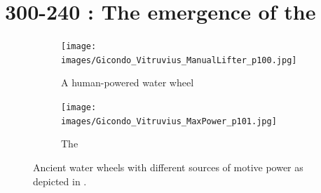 \documentclass[a4paper, 12pt]{article}
\begin{document}






\section{300-240 \bce: The emergence of the \SE}
\label{sec:stesibuque}

\begin{figure}[H]
    \centering
    \begin{subfigure}{.45\textwidth}
        \centering
        \texttt{[image: images/Gicondo\_Vitruvius\_ManualLifter\_p100.jpg]}
        \caption{A human-powered water wheel} \label{fig:Gicondo_Vitruvius_MaxPower_p100}
    \end{subfigure}
    \hspace{2em}%
    \begin{subfigure}{.45\textwidth}
        \centering
        \texttt{[image: images/Gicondo\_Vitruvius\_MaxPower\_p101.jpg]}
        \caption{The \SE} \label{fig:Gicondo_Vitruvius_MaxPower_p101}
    \end{subfigure}
    \caption{Ancient water wheels with different sources of motive power as depicted in \citet[pp.~100-101]{vitruvius_architectura_1511}.}  \label{fig:two:wheels}
\end{figure}
\end{document}
